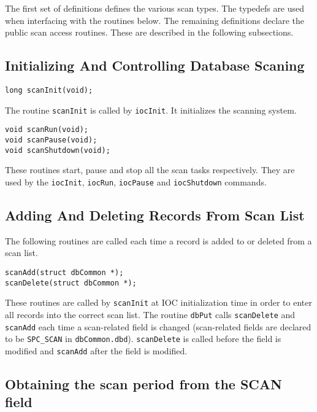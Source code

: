 The first set of definitions defines the various scan types.
The typedefs are used when interfacing with the routines below.
The remaining definitions declare the public scan access routines.
These are described in the following subsections.

\subsection{Initializing And Controlling Database Scaning}

\begin{verbatim}
long scanInit(void);
\end{verbatim}

The routine \verb|scanInit| is called by \verb|iocInit|.
It initializes the scanning system.

\begin{verbatim}
void scanRun(void);
void scanPause(void);
void scanShutdown(void);
\end{verbatim}

These routines start, pause and stop all the scan tasks respectively.
They are used by the \verb|iocInit|, \verb|iocRun|, \verb|iocPause| and \verb|iocShutdown| commands.

\subsection{Adding And Deleting Records From Scan List}

The following routines are called each time a record is added to or deleted from a scan list.

\begin{verbatim}
scanAdd(struct dbCommon *);
scanDelete(struct dbCommon *);
\end{verbatim}

These routines are called by \verb|scanInit| at IOC initialization time in order to enter all records into the correct scan list.
The routine \verb|dbPut| calls \verb|scanDelete| and \verb|scanAdd| each time a scan-related field is changed (scan-related fields are declared to be \verb|SPC_SCAN| in \verb|dbCommon.dbd|).
\verb|scanDelete| is called before the field is modified and \verb|scanAdd| after the field is modified.

\subsection{Obtaining the scan period from the SCAN field}

